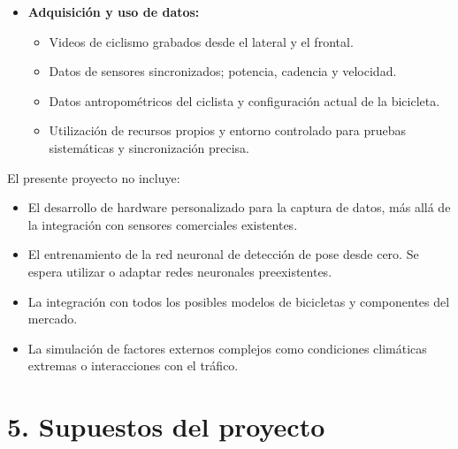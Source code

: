\documentclass[
11pt, %
]{charter}
\begin{document}
\begin{itemize}
    \item \textbf{Adquisición y uso de datos:}
        \begin{itemize}
            \item Videos de ciclismo grabados desde el lateral y el frontal.
            \item Datos de sensores sincronizados; potencia, cadencia y velocidad.
            \item Datos antropométricos del ciclista y configuración actual de la bicicleta.
            \item Utilización de recursos propios y entorno controlado para pruebas sistemáticas y sincronización precisa.
        \end{itemize}
\end{itemize}

El presente proyecto no incluye:
\begin{itemize}
    
    \item El desarrollo de hardware personalizado para la captura de datos, más allá de la integración con sensores comerciales existentes.
    \item El entrenamiento de la red neuronal de detección de pose desde cero. Se espera utilizar o adaptar redes neuronales preexistentes.
    \item La integración con todos los posibles modelos de bicicletas y componentes del mercado.
    \item La simulación de factores externos complejos como condiciones climáticas extremas o interacciones con el tráfico.
\end{itemize}

\section{5. Supuestos del proyecto}
\label{sec:supuestos}
\end{document}
